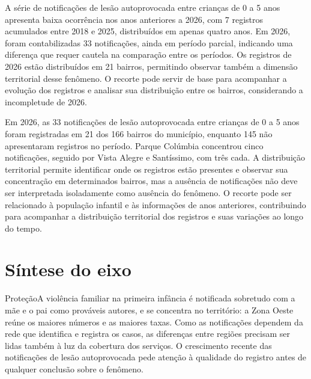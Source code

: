 
A série de notificações de lesão autoprovocada entre crianças de 0 a 5 anos apresenta baixa ocorrência nos anos anteriores a 2026, com 7 registros acumulados entre 2018 e 2025, distribuídos em apenas quatro anos. Em 2026, foram contabilizadas 33 notificações, ainda em período parcial, indicando uma diferença que requer cautela na comparação entre os períodos. Os registros de 2026 estão distribuídos em 21 bairros, permitindo observar também a dimensão territorial desse fenômeno. O recorte pode servir de base para acompanhar a evolução dos registros e analisar sua distribuição entre os bairros, considerando a incompletude de 2026.


Em 2026, as 33 notificações de lesão autoprovocada entre crianças de 0 a 5 anos foram registradas em 21 dos 166 bairros do município, enquanto 145 não apresentaram registros no período. Parque Colúmbia concentrou cinco notificações, seguido por Vista Alegre e Santíssimo, com três cada. A distribuição territorial permite identificar onde os registros estão presentes e observar sua concentração em determinados bairros, mas a ausência de notificações não deve ser interpretada isoladamente como ausência do fenômeno. O recorte pode ser relacionado à população infantil e às informações de anos anteriores, contribuindo para acompanhar a distribuição territorial dos registros e suas variações ao longo do tempo.


\section{Síntese do eixo}

\begin{sintese}{Proteção}A violência familiar na primeira infância é notificada sobretudo com a mãe e o pai como prováveis autores, e se concentra no território: a Zona Oeste reúne os maiores números e as maiores taxas. Como as notificações dependem da rede que identifica e registra os casos, as diferenças entre regiões precisam ser lidas também à luz da cobertura dos serviços. O crescimento recente das notificações de lesão autoprovocada pede atenção à qualidade do registro antes de qualquer conclusão sobre o fenômeno.\end{sintese}

